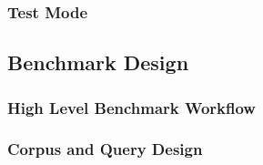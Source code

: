 \subsubsection{Test Mode}

\subsection{Benchmark Design}
\subsubsection{High Level Benchmark Workflow}

\subsubsection{Corpus and Query Design}



